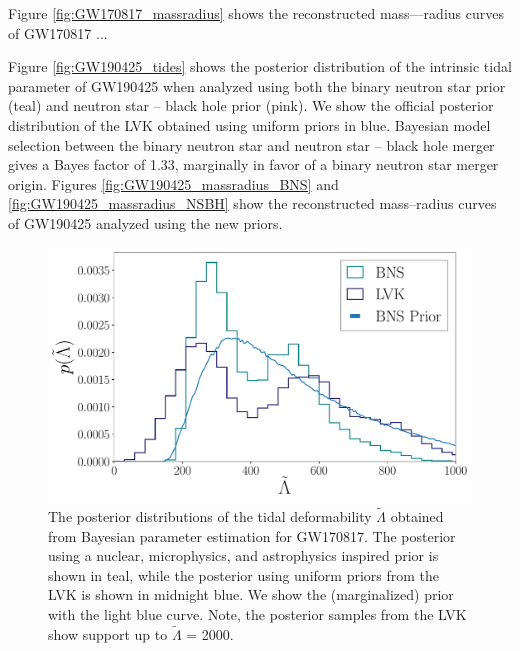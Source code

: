 \documentclass[twocolumn]{aastex631}
\begin{document}
Figure \ref{fig:GW170817_massradius} shows the reconstructed mass---radius curves of GW170817 ... 

Figure \ref{fig:GW190425_tides} shows the posterior distribution of the intrinsic tidal parameter of GW190425 when analyzed using both the binary neutron star prior (teal) and neutron star -- black hole prior (pink). We show the official posterior distribution of the LVK obtained using uniform priors in blue. 
Bayesian model selection between the binary neutron star and neutron star -- black hole merger gives a Bayes factor of 1.33, marginally in favor of a binary neutron star merger origin. 
Figures \ref{fig:GW190425_massradius_BNS} and \ref{fig:GW190425_massradius_NSBH} show the reconstructed mass--radius curves of GW190425 analyzed using the new priors.  
\begin{figure}[H]
		\centering
		\includegraphics[width=1.\linewidth]{Fig_2_GW170817_lambda_tilde_posteriors_BNS.pdf}
		\caption{The posterior distributions of the tidal deformability $\tilde{\Lambda}$ obtained from Bayesian parameter estimation for GW170817. The posterior using a nuclear, microphysics, and astrophysics inspired prior is shown in teal, while the posterior using uniform priors from the LVK is shown in midnight blue. We show the (marginalized) prior with the light blue curve. Note, the posterior samples from the LVK show support up to $\tilde{\Lambda}$ = 2000. }
		\label{fig:GW170817_tides}
\end{figure}
\end{document}
